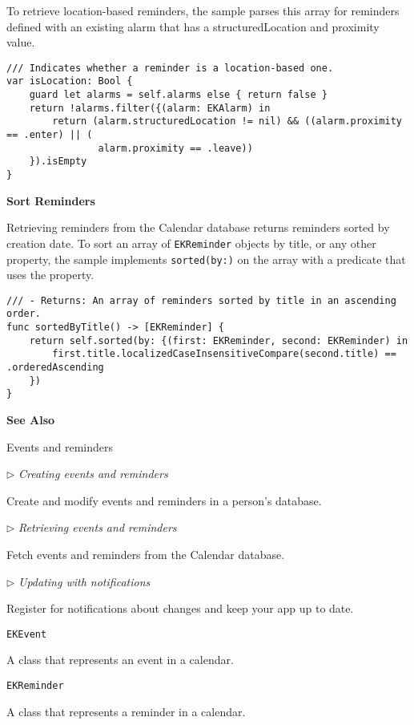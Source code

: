 \documentclass{article}
\begin{document}
To retrieve location-based reminders, the sample parses this array for reminders defined with an existing alarm
that has a structuredLocation and proximity value.

\begin{verbatim}
/// Indicates whether a reminder is a location-based one.
var isLocation: Bool {
    guard let alarms = self.alarms else { return false }
    return !alarms.filter({(alarm: EKAlarm) in
        return (alarm.structuredLocation != nil) && ((alarm.proximity == .enter) || (
                alarm.proximity == .leave))
    }).isEmpty
}
\end{verbatim}

\textbf{Sort Reminders}

Retrieving reminders from the Calendar database returns reminders sorted by creation date. To sort an array of
\texttt{EKReminder} objects by title, or any other property, the sample implements \texttt{sorted(by:)} on the array with a
predicate that uses the property.

\begin{verbatim}
/// - Returns: An array of reminders sorted by title in an ascending order.
func sortedByTitle() -> [EKReminder] {
    return self.sorted(by: {(first: EKReminder, second: EKReminder) in
        first.title.localizedCaseInsensitiveCompare(second.title) == .orderedAscending
    })
}
\end{verbatim}

\textbf{See Also}

Events and reminders

$\rhd$ \textit{Creating events and reminders}

Create and modify events and reminders in a person's database.

$\rhd$ \textit{Retrieving events and reminders}

Fetch events and reminders from the Calendar database.

$\rhd$ \textit{Updating with notifications}

Register for notifications about changes and keep your app up to date.

\texttt{EKEvent}

A class that represents an event in a calendar.

\texttt{EKReminder}

A class that represents a reminder in a calendar.
\newpage
\end{document}
